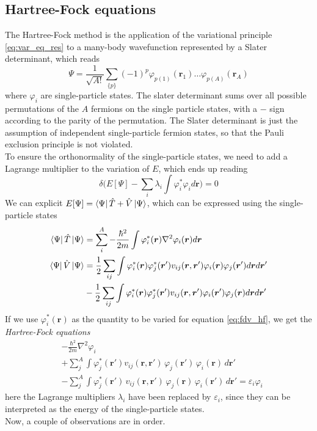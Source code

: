 \subsection{Hartree-Fock equations}
The Hartree-Fock method is the application of the variational principle \eqref{eq:var_eq_res} to a many-body wavefunction represented by a Slater determinant, which reads
\begin{equation}
    \label{eq:slater_formula}
    \Psi = \frac{1}{\sqrt {A!}} \sum_{\{p\}} (-1)^{p}  \varphi_{p(1)}(\bm r_1)\ldots \varphi_{p(A)}(\bm r_A)
\end{equation}
where $\varphi_i$ are single-particle states.
The slater determinant sums over all possible permutations of the $A$ fermions on the single particle states, with a $-$ sign according to the parity of the permutation.
The Slater determinant is just the assumption of independent single-particle fermion states, so that the Pauli exclusion principle is not violated.
\\To ensure the orthonormality of the single-particle states, we need to add a Lagrange multiplier to the variation of $E$, which ends up reading
\begin{equation}
    \label{eq:fdv_hf}
\delta \bigg(E[\Psi] - \sum_i\lambda_i \int \varphi_i^*\varphi_i d\bm r \bigg) = 0
\end{equation}
We can explicit $E[\Psi] = \bra{\Psi} \hat T + \hat V\ket \Psi$, which can be expressed using the single-particle states 
\begin{align}
    \label{eq:exp_T_V}
    \bra\Psi\hat T\ket \Psi &= \sum_i^A -\frac{\hbar^2}{2m}\int \varphi_i^*(\bm r) \nabla^2 \varphi_i(\bm r) d\bm r\\
    \bra\Psi\hat V\ket \Psi &= \frac 1 2 \sum_{ij}\int\varphi_i^*(\bm r) \varphi_j^*(\bm r') v_{ij}(\bm r, \bm r')\varphi_i(\bm r)\varphi_j(\bm r') d\bm r d\bm r'\\
    &- \frac 1 2 \sum_{ij}\int \varphi_i^*(\bm r) \varphi_j^*(\bm r') v_{ij}(\bm r, \bm r')\varphi_i(\bm r')\varphi_j(\bm r) d\bm r d\bm r'
\end{align}
If we use $\varphi_i^*(\bm r)$ as the quantity to be varied for equation \eqref{eq:fdv_hf}, we get the \textit{Hartree-Fock equations}
\begin{align}
    \label{eq:hf_equations}
    &-\frac{\hbar^2}{2m} \nabla^2 \varphi_i\\
    &+ \sum_{j}^A \int \varphi_j^* (\mathbf r') 
        v_{ij}(\mathbf r, \mathbf r')\, 
        \varphi_j (\mathbf r')\, 
        \varphi_i (\mathbf r)\, d\mathbf r'\label{eq:hartree} \\
    &- \sum_{j}^A \int \varphi_j^* (\mathbf r')\, 
        v_{ij}(\mathbf r, \mathbf r')\,
        \varphi_j (\mathbf r)\,
        \varphi_i (\mathbf r')\, d\mathbf r'\label{eq:fock}
        = \varepsilon_i \varphi_i
\end{align}
here the Lagrange multipliers $\lambda_i$ have been replaced by $\varepsilon_i$, since they can be interpreted as the energy of the single-particle states.\\
Now, a couple of observations are in order.
